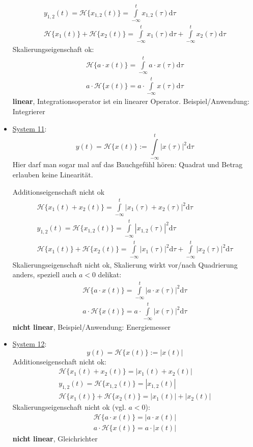 \documentclass[11pt,a4paper,DIV=12]{scrartcl}
\numberwithin{equation}{section}
\numberwithin{figure}{section}
\newcommand\fsd{\mathrm{d}} %
\newcommand{\sysH}[1]{\mathcal{H}{\{#1\}}}
\begin{document}
\begin{Loesung}
\begin{itemize}
\begin{align}
y_{1,2}(t) = \sysH{x_{1,2}(t)}= \int\limits_{-\infty}^{t} x_{1,2}(\tau) \fsd \tau\\
\sysH{x_1(t)} + \sysH{x_2(t)} = \int\limits_{-\infty}^{t} x_1(\tau) \fsd \tau + \int\limits_{-\infty}^{t} x_2(\tau) \fsd \tau
\end{align}
Skalierungseigenschaft ok:
\begin{align}
\sysH{a \cdot x(t)}= \int\limits_{-\infty}^{t} a \cdot x(\tau) \fsd \tau\\
a \cdot \sysH{x(t)}= a \cdot \int\limits_{-\infty}^{t} x(\tau) \fsd \tau
\end{align}
\textbf{linear}, Integrationsoperator ist ein linearer Operator.
Beispiel/Anwendung: Integrierer
\item  \underline{System 11}:
\begin{equation}
y(t) = \sysH{x(t)}:= \int\limits_{-\infty}^{t} |x(\tau)|^2 \fsd \tau
\end{equation}
Hier darf man sogar mal auf das Bauchgefühl hören: Quadrat und Betrag erlauben
keine Linearität.

Additionseigenschaft nicht ok
\begin{align}
\sysH{x_1(t)+x_2(t)}= \int\limits_{-\infty}^{t} |x_1(\tau)+x_2(\tau)|^2 \fsd \tau\\
y_{1,2}(t) = \sysH{x_{1,2}(t)}= \int\limits_{-\infty}^{t} |x_{1,2}(\tau)|^2 \fsd \tau\\
\sysH{x_1(t)} + \sysH{x_2(t)} = \int\limits_{-\infty}^{t} |x_{1}(\tau)|^2 \fsd \tau+\int\limits_{-\infty}^{t} |x_{2}(\tau)|^2 \fsd \tau
\end{align}
Skalierungseigenschaft nicht ok, Skalierung wirkt vor/nach Quadrierung anders,
speziell auch $a<0$ delikat:
\begin{align}
\sysH{a \cdot x(t)}= \int\limits_{-\infty}^{t} |a \cdot x(\tau)|^2 \fsd \tau\\
a \cdot \sysH{x(t)}= a\cdot \int\limits_{-\infty}^{t} |x(\tau)|^2 \fsd \tau
\end{align}
\textbf{nicht linear}, Beispiel/Anwendung: Energiemesser
\item  \underline{System 12}:
\begin{equation}
y(t) = \sysH{x(t)}:= |x(t)|
\end{equation}
Additionseigenschaft nicht ok:
\begin{align}
\sysH{x_1(t)+x_2(t)}= |x_1(t) + x_2(t)|\\
y_{1,2}(t) = \sysH{x_{1,2}(t)}= |x_{1,2}(t)|\\
\sysH{x_1(t)} + \sysH{x_2(t)} = |x_1(t)| + |x_2(t)|
\end{align}
Skalierungseigenschaft nicht ok (vgl. $a<0$):
\begin{align}
\sysH{a \cdot x(t)}= |a \cdot x(t)|\\
a \cdot \sysH{x(t)}= a \cdot |x(t)|
\end{align}
\textbf{nicht linear}, Gleichrichter


\end{itemize}
\end{Loesung}
\end{document}
